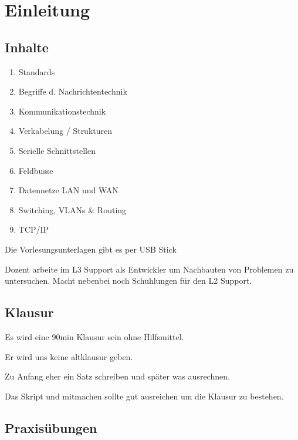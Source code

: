 \documentclass[a4paper]{article}
\title{\docTitle}
\author{Moritz}
\date{\today}
\begin{document}
\maketitle
\tableofcontents


\section{Einleitung}

\subsection{Inhalte}

\begin{enumerate}
    \item Standards
    \item Begriffe d. Nachrichtentechnik
    \item Kommunikationstechnik
    \item Verkabelung / Strukturen
    \item Serielle Schnittstellen
    \item Feldbusse
    \item Datennetze LAN und WAN
    \item Switching, VLANs \& Routing
    \item TCP/IP
\end{enumerate}

Die Vorlesungsunterlagen gibt es per USB Stick

Dozent arbeite im L3 Support als Entwickler um Nachbauten von Problemen zu untersuchen. Macht nebenbei noch Schuhlungen für den L2 Support.

\subsection{Klausur}

Es wird eine 90min Klausur sein ohne Hilfsmittel.

Er wird uns keine altklausur geben. 

Zu Anfang eher ein Satz schreiben und später was ausrechnen.

Das Skript und mitmachen sollte gut ausreichen um die Klausur zu bestehen.

\subsection{Praxisübungen}
\end{document}
